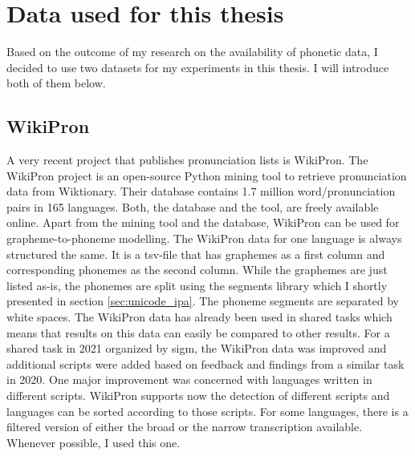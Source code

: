 \section{Data used for this thesis}
\label{sec:dataset}
Based on the outcome of my research on the availability of phonetic data, I decided to use two datasets for my experiments in this thesis. I will introduce both of them below. 

\subsection{WikiPron}
A very recent project that publishes pronunciation lists is WikiPron. The WikiPron project \citep{Lee&Ashby.2020} is an open-source Python mining tool to retrieve pronunciation data from Wiktionary. Their database contains 1.7 million word/pronunciation pairs in 165 languages. Both, the database and the tool, are freely available online. Apart from the mining tool and the database, WikiPron can be used for grapheme-to-phoneme modelling. The WikiPron data for one language is always structured the same. It is a tsv-file that has graphemes as a first column and corresponding phonemes as the second column. While the graphemes are just listed as-is, the phonemes are split using the segments library which I shortly presented in section \ref{sec:unicode_ipa}. The phoneme segments are separated by white spaces. 
The WikiPron data has already been used in shared tasks which means that results on this data can easily be compared to other results. For a shared task in 2021 organized by \ac{sigm}, the WikiPron data was improved and additional scripts were added based on feedback and findings from a similar task in 2020. One major improvement was concerned with languages written in different scripts. WikiPron supports now the detection of different scripts and languages can be sorted according to those scripts. For some languages, there is a filtered version of either the broad or the narrow transcription available. Whenever possible, I used this one.


